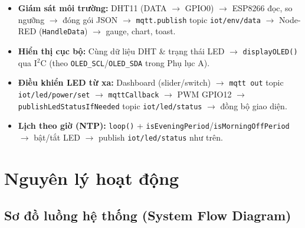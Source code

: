 \documentclass[13pt,a4paper]{article}
\newcommand{\code}[1]{\texttt{#1}}
\begin{document}
\begin{itemize}
    \item \textbf{Giám sát môi trường:} DHT11 (DATA $\rightarrow$ GPIO0) $\rightarrow$ ESP8266 đọc, so ngưỡng $\rightarrow$ đóng gói JSON $\rightarrow$ \code{mqtt.publish} topic \code{iot/env/data} $\rightarrow$ Node-RED (\code{HandleData}) $\rightarrow$ gauge, chart, toast.
    \item \textbf{Hiển thị cục bộ:} Cùng dữ liệu DHT \& trạng thái LED $\rightarrow$ \code{displayOLED()} qua I$^2$C (theo \code{OLED\_SCL}/\code{OLED\_SDA} trong Phụ lục A).
    \item \textbf{Điều khiển LED từ xa:} Dashboard (slider/switch) $\rightarrow$ \code{mqtt out} topic \code{iot/led/power/set} $\rightarrow$ \code{mqttCallback} $\rightarrow$ PWM GPIO12 $\rightarrow$ \code{publishLedStatusIfNeeded} topic \code{iot/led/status} $\rightarrow$ đồng bộ giao diện.
    \item \textbf{Lịch theo giờ (NTP):} \code{loop()} + \code{isEveningPeriod}/\code{isMorningOffPeriod} $\rightarrow$ bật/tắt LED $\rightarrow$ publish \code{iot/led/status} như trên.
\end{itemize}

\section{Nguyên lý hoạt động}
\label{sec:nguyenly}

\subsection{Sơ đồ luồng hệ thống (System Flow Diagram)}
\label{sec:sodoluong}
\end{document}
